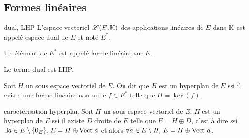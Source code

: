 \subsection{Formes linéaires}

\begin{definition}{dual, LHP}{}
    L'espace vectoriel $\mathscr L(E, \mathbb{K})$ des applications linéaires de $E$ dans $\mathbb{K}$ est appelé 
    espace dual de $E$ et noté $E^*$.

    Un élément de $E^*$ est appelé forme linéaire sur $E$.
\end{definition}

\begin{remarque}
    Le terme dual est LHP. 
\end{remarque}

\begin{definition}{}{}
    Soit $H$ un sous espace vectoriel de $E$. On dit que $H$ est un hyperplan de $E$ ssi
    il existe une forme linéaire non nulle $f \in E^*$ telle que $H = \ker(f)$.
\end{definition}

\begin{proposition}{caractérisation hyperplan}{}
    Soit $H$ un sous-espace vectoriel de $E$. $H$ est un hyperplan de $E$ ssi il existe $D$ droite de $E$ telle que 
    $E = H \oplus D$, c'est à dire ssi $\exists a \in E \setminus \{0_E\}, \, E = H \oplus \operatorname{Vect} \, a$ 
    et alors $\forall a \in E \setminus H, \, E = H \oplus \operatorname{Vect} \, a$.
\end{proposition}



